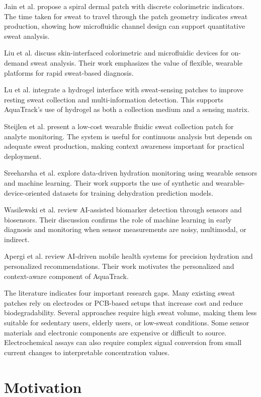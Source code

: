 Jain et al. propose a spiral dermal patch with discrete colorimetric indicators. The time taken for sweat to travel through the patch geometry indicates sweat production, showing how microfluidic channel design can support quantitative sweat analysis.

Liu et al. discuss skin-interfaced colorimetric and microfluidic devices for on-demand sweat analysis. Their work emphasizes the value of flexible, wearable platforms for rapid sweat-based diagnosis.

Lu et al. integrate a hydrogel interface with sweat-sensing patches to improve resting sweat collection and multi-information detection. This supports AquaTrack's use of hydrogel as both a collection medium and a sensing matrix.

Steijlen et al. present a low-cost wearable fluidic sweat collection patch for analyte monitoring. The system is useful for continuous analysis but depends on adequate sweat production, making context awareness important for practical deployment.

Sreeharsha et al. explore data-driven hydration monitoring using wearable sensors and machine learning. Their work supports the use of synthetic and wearable-device-oriented datasets for training dehydration prediction models.

Wasilewski et al. review AI-assisted biomarker detection through sensors and biosensors. Their discussion confirms the role of machine learning in early diagnosis and monitoring when sensor measurements are noisy, multimodal, or indirect.

Apergi et al. review AI-driven mobile health systems for precision hydration and personalized recommendations. Their work motivates the personalized and context-aware component of AquaTrack.

The literature indicates four important research gaps. Many existing sweat patches rely on electrodes or PCB-based setups that increase cost and reduce biodegradability. Several approaches require high sweat volume, making them less suitable for sedentary users, elderly users, or low-sweat conditions. Some sensor materials and electronic components are expensive or difficult to source. Electrochemical assays can also require complex signal conversion from small current changes to interpretable concentration values.

\section[Motivation]{\textbf{Motivation}}

